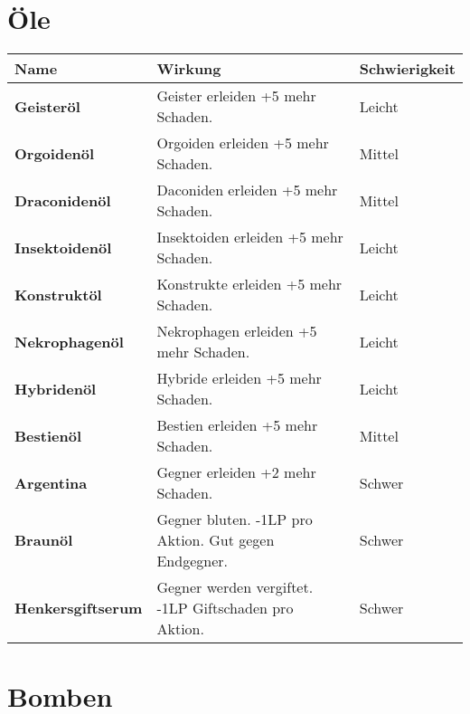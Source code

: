 \section{Öle}

\begin{tabular}{|p{4cm}|p{8.5cm}|p{3cm}|}
\hline
\textbf{Name} & \textbf{Wirkung} & \textbf{Schwierigkeit} \\

\hline
\textbf{Geisteröl} & Geister erleiden +5 mehr Schaden. & Leicht \\

\hline
\textbf{Orgoidenöl} & Orgoiden erleiden +5 mehr Schaden. & Mittel \\

\hline
\textbf{Draconidenöl} & Daconiden erleiden +5 mehr Schaden. & Mittel \\

\hline
\textbf{Insektoidenöl} & Insektoiden erleiden +5 mehr Schaden. & Leicht \\

\hline
\textbf{Konstruktöl} & Konstrukte erleiden +5 mehr Schaden. & Leicht \\

\hline
\textbf{Nekrophagenöl} & Nekrophagen erleiden +5 mehr Schaden. & Leicht \\

\hline
\textbf{Hybridenöl} & Hybride erleiden +5 mehr Schaden. & Leicht \\

\hline
\textbf{Bestienöl} & Bestien erleiden +5 mehr Schaden. & Mittel \\

\hline
\textbf{Argentina} & Gegner erleiden +2 mehr Schaden. & Schwer \\

\hline
\textbf{Braunöl} & Gegner bluten. -1LP pro Aktion. Gut gegen Endgegner. & Schwer \\

\hline
\textbf{Henkersgiftserum} & Gegner werden vergiftet. -1LP Giftschaden pro Aktion. & Schwer \\

\hline
\end{tabular}

\section{Bomben}